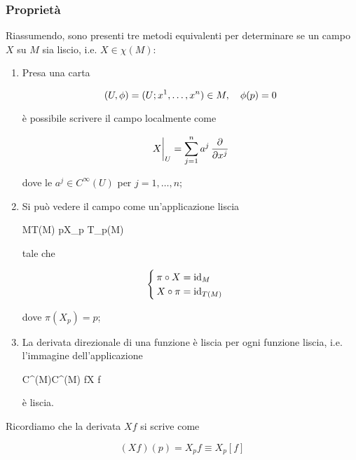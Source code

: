 \subsubsection{Proprietà}

Riassumendo, sono presenti tre metodi equivalenti per determinare se un campo $ X $ su $ M $ sia liscio, i.e. $ X \in \chi(M) $:

\begin{enumerate}
	\item Presa una carta
	
	\begin{equation}
		(U,\phi) = (U; x^{1},\dots,x^{n}) \in M \qcomma \phi(p) = 0
	\end{equation}
	
	è possibile scrivere il campo localmente come
	
	\begin{equation}
		\eval{X}_{U} = \sum_{j=1}^{n} a^{j} \, \pdv{x^{j}}
	\end{equation}

	dove le $ a^{j} \in C^{\infty}(U) $ per $ j=1,\dots,n $;
	
	
	\item Si può vedere il campo come un'applicazione liscia
	
		{M}{T(M)}
		{p}{X_{p} \in T_{p}(M)}
	
	tale che
	
	\begin{equation}
		\begin{cases}
			\pi \circ X = \operatorname{id}_{M} \\
			X \circ \pi = \operatorname{id}_{T(M)}
		\end{cases}
	\end{equation}	
	
	dove $ \pi(X_{p}) = p $;
	
	
	\item La derivata direzionale di una funzione è liscia per ogni funzione liscia, i.e. l'immagine dell'applicazione
	
		{C^{\infty}(M)}{C^{\infty}(M)}
		{f}{X f}

	è liscia.
\end{enumerate}

Ricordiamo che la derivata $ X f $ si scrive come

\begin{equation}
	(X f)(p) = X_{p} f \equiv X_{p} [f]
\end{equation}

